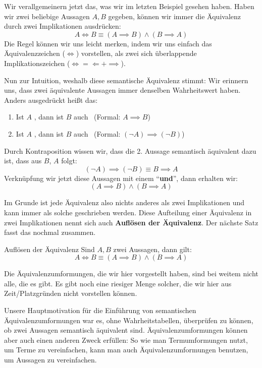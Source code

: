 \documentclass[../../main.tex]{subfiles}
\newcommand{\statement}[1]{\textrm{\enquote{\textbf{#1}}}}
\def\wahr{\text{\color{green!50!black}wahr}}
\def\falsch{\text{\color{red!80!black}falsch}}
\begin{document}
    Wir verallgemeinern jetzt das, was wir im letzten Beispiel gesehen haben.
     Haben wir zwei beliebige Aussagen $A,B$ gegeben, können wir immer die Äquivalenz
     durch zwei Implikationen ausdrücken:
    \[A \iff B \equiv (A \implies B) \land (B \implies A)\]
    Die Regel können wir uns leicht merken, indem wir uns einfach das Äquivalenzzeichen
    ($\iff$) vorstellen, als zwei sich überlappende Implikationszeichen ($\iff = \Longleftarrow + \implies$).

    Nun zur Intuition, weshalb diese semantische Äquivalenz stimmt: Wir erinnern uns, dass zwei äquivalente Aussagen 
    immer denselben Wahrheitswert haben. Anders ausgedrückt heißt das:
    \begin{enumerate}
        \item Ist $A$ \wahr, dann ist $B$ auch \wahr\  (Formal: $A \implies B$)
        \item Ist $A$ \falsch, dann ist $B$ auch \falsch\  (Formal: $(\lnot A) \implies (\lnot B)$)
    \end{enumerate}
    Durch Kontraposition wissen wir, dass die 2. Aussage semantisch äquivalent dazu ist,
    dass aus $B$, $A$ folgt:
    \[(\lnot A) \implies (\lnot B) \equiv B \implies A\]
    Verknüpfung wir jetzt diese Aussagen mit einem \statement{und}, dann erhalten wir:
    \[(A \implies B) \land (B \implies A)\]
    
    Im Grunde ist jede Äquivalenz also nichts anderes als zwei Implikationen und kann immer als solche geschrieben werden. 
    Diese Aufteilung einer Äquivalenz in zwei Implikationen nennt sich auch \textbf{Auflösen der Äquivalenz}.
    Der nächste Satz fasst das nochmal zusammen.
    
    \begin{lemma}{Auflösen der Äquivalenz}
    Sind $A,B$ zwei Aussagen, dann gilt:
        \[ A \iff B \equiv (A \implies B) \land (B \implies A)\]
    \end{lemma}
    
    
    Die Äquivalenzumformungen, die wir hier vorgestellt haben, sind bei weitem nicht alle, die es gibt. Es gibt
    noch eine riesiger Menge solcher, die wir hier aus Zeit/Platzgründen nicht vorstellen können.
    
    Unsere Hauptmotivation für die Einführung von semantischen Äquivalenzumformungen war es, ohne
    Wahrheitstabellen, überprüfen zu können, ob zwei Aussagen semantisch äquivalent sind. 
    Äquivalenzumformungen können aber auch einen anderen Zweck erfüllen: So wie man Termumformungen
    nutzt, um Terme zu vereinfachen, kann man auch Äquivalenzumformungen benutzen, um Aussagen
    zu vereinfachen.
\end{document}
